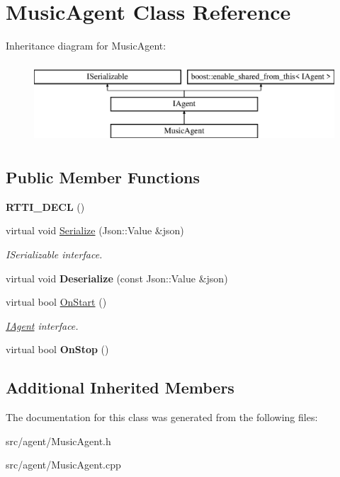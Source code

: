 \hypertarget{class_music_agent}{}\section{Music\+Agent Class Reference}
\label{class_music_agent}
Inheritance diagram for Music\+Agent\+:\begin{figure}[H]
\begin{center}
\leavevmode
\includegraphics[height=3.000000cm]{class_music_agent}
\end{center}
\end{figure}
\subsection*{Public Member Functions}
\begin{DoxyCompactItemize}
\item 
\mbox{\label{class_music_agent_a631da0d7662a533ca1cd7e0c41c8010d}} 
{\bfseries R\+T\+T\+I\+\_\+\+D\+E\+CL} ()
\item 
\mbox{\label{class_music_agent_acbb3e3562be57695f26bb5fe3b76bad7}} 
virtual void \hyperlink{class_music_agent_acbb3e3562be57695f26bb5fe3b76bad7}{Serialize} (Json\+::\+Value \&json)
\begin{DoxyCompactList}\small\item\em I\+Serializable interface. \end{DoxyCompactList}\item 
\mbox{\label{class_music_agent_ab6846bceaa30427dd884807df43c5507}} 
virtual void {\bfseries Deserialize} (const Json\+::\+Value \&json)
\item 
\mbox{\label{class_music_agent_a1787d57f4d6b420a1933beb6255090cd}} 
virtual bool \hyperlink{class_music_agent_a1787d57f4d6b420a1933beb6255090cd}{On\+Start} ()
\begin{DoxyCompactList}\small\item\em \hyperlink{class_i_agent}{I\+Agent} interface. \end{DoxyCompactList}\item 
\mbox{\label{class_music_agent_a99534051388c02384450d8a746719456}} 
virtual bool {\bfseries On\+Stop} ()
\end{DoxyCompactItemize}
\subsection*{Additional Inherited Members}


The documentation for this class was generated from the following files\+:\begin{DoxyCompactItemize}
\item 
src/agent/Music\+Agent.\+h\item 
src/agent/Music\+Agent.\+cpp\end{DoxyCompactItemize}
